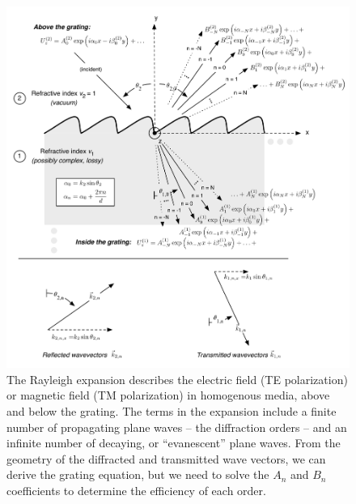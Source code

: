 \begin{figure}[htbp] %
   \centering
   \includegraphics[scale=0.8]{../data/Chapter2/2b_rayleighExpansion/2b.pdf} 
   \caption[The Rayleigh expansion describes the electric field (TE polarization) or magnetic field (TM polarization) in homogenous media, above and below the grating.]{The Rayleigh expansion describes the electric field (TE polarization) or magnetic field (TM polarization) in homogenous media, above and below the grating.  The terms in the expansion include a finite number of propagating plane waves -- the diffraction orders -- and an infinite number of decaying, or ``evanescent'' plane waves. From the geometry of the diffracted and transmitted wave vectors, we can derive the grating equation, but we need to solve the $A_n$ and $B_n$ coefficients to determine the efficiency of each order. }
   \label{2b}
\end{figure}

